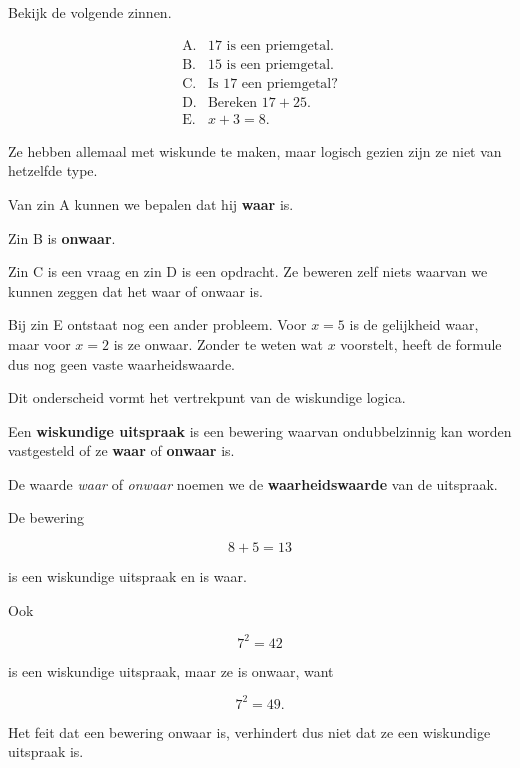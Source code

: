 \documentclass{ximera}
\begin{document}

Bekijk de volgende zinnen.

\[
\begin{array}{ll}
\text{A.} & 17\text{ is een priemgetal.}\\[2mm]
\text{B.} & 15\text{ is een priemgetal.}\\[2mm]
\text{C.} & \text{Is }17\text{ een priemgetal?}\\[2mm]
\text{D.} & \text{Bereken }17+25.\\[2mm]
\text{E.} & x+3=8.
\end{array}
\]

Ze hebben allemaal met wiskunde te maken, maar logisch gezien zijn ze
niet van hetzelfde type.

Van zin A kunnen we bepalen dat hij \textbf{waar} is.

Zin B is \textbf{onwaar}.

Zin C is een vraag en zin D is een opdracht. Ze beweren zelf niets
waarvan we kunnen zeggen dat het waar of onwaar is.

Bij zin E ontstaat nog een ander probleem. Voor $x=5$ is de gelijkheid
waar, maar voor $x=2$ is ze onwaar. Zonder te weten wat $x$ voorstelt,
heeft de formule dus nog geen vaste waarheidswaarde.

Dit onderscheid vormt het vertrekpunt van de wiskundige logica.


\begin{definitie}
Een \textbf{wiskundige uitspraak} is een bewering waarvan
ondubbelzinnig kan worden vastgesteld of ze \textbf{waar} of
\textbf{onwaar} is.

De waarde \emph{waar} of \emph{onwaar} noemen we de
\textbf{waarheidswaarde} van de uitspraak.
\end{definitie}


\begin{voorbeeld}

De bewering

\[
8+5=13
\]

is een wiskundige uitspraak en is waar.

Ook

\[
7^2=42
\]

is een wiskundige uitspraak, maar ze is onwaar, want

\[
7^2=49.
\]

Het feit dat een bewering onwaar is, verhindert dus niet dat ze een
wiskundige uitspraak is.
\end{voorbeeld}
\end{document}
